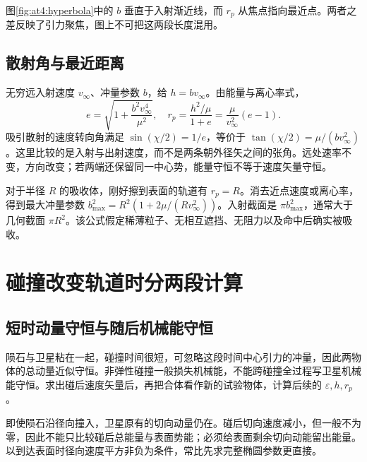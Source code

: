 图\ref{fig:at4:hyperbola}中的 $b$ 垂直于入射渐近线，而 $r_p$ 从焦点指向最近点。两者之差反映了引力聚焦，图上不可把这两段长度混用。\subsection{散射角与最近距离}

无穷远入射速度 $v_\infty$、冲量参数 $b$，给 $h=bv_\infty$。由能量与离心率式，
\[e=\sqrt{1+\frac{b^2v_\infty^4}{\mu^2}},\quad
r_p=\frac{h^2/\mu}{1+e}=\frac\mu{v_\infty^2}(e-1).\]
吸引散射的速度转向角满足 $\sin(\chi/2)=1/e$，等价于 $\tan(\chi/2)=\mu/(bv_\infty^2)$。这里比较的是入射与出射速度，而不是两条朝外径矢之间的张角。远处速率不变，方向改变；若两端还保留同一中心势，能量守恒不等于速度矢量守恒。

对于半径 $R$ 的吸收体，刚好擦到表面的轨道有 $r_p=R$。消去近点速度或离心率，得到最大冲量参数 $b_{\max}^2=R^2(1+2\mu/(Rv_\infty^2))$。入射截面是 $\pi b_{\max}^2$，通常大于几何截面 $\pi R^2$。该公式假定稀薄粒子、无相互遮挡、无阻力以及命中后确实被吸收。


\section{碰撞改变轨道时分两段计算}
\subsection{短时动量守恒与随后机械能守恒}

陨石与卫星粘在一起，碰撞时间很短，可忽略这段时间中心引力的冲量，因此两物体的总动量近似守恒。非弹性碰撞一般损失机械能，不能跨碰撞全过程写卫星机械能守恒。求出碰后速度矢量后，再把合体看作新的试验物体，计算后续的 $\varepsilon,h,r_p$。

即使陨石沿径向撞入，卫星原有的切向动量仍在。碰后切向速度减小，但一般不为零，因此不能只比较碰后总能量与表面势能；必须给表面剩余切向动能留出能量。以到达表面时径向速度平方非负为条件，常比先求完整椭圆参数更直接。

